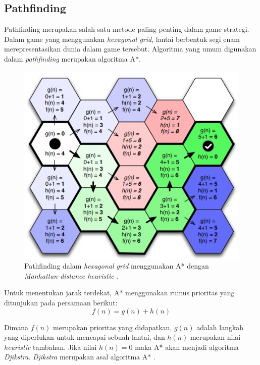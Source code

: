 \subsection{Pathfinding}
Pathfinding merupakan salah satu metode paling penting dalam game strategi.
Dalam game yang menggunakan \emph{hexagonal grid}, lantai berbentuk segi enam merepresentasikan dunia dalam game tersebut.
Algoritma yang umum digunakan dalam \emph{pathfinding} merupakan algoritma A*.

\begin{figure}[H]
  \centering
    \includegraphics[scale=1]{gambar/pathfinding_hexagonal_grids.jpg}
    \caption{Pathfinding dalam \emph{hexagonal grid} menggunakan A* dengan \emph{Manhattan-distance heuristic} \citep{AI4X}.}
    \label{fig:pathfindingHexagonalGrid}
\end{figure}

Untuk menentukan jarak terdekat, A* menggunakan rumus prioritas yang ditunjukan pada persamaan berikut:
\begin{equation}
  f(n) = g(n) + h(n)
\end{equation}

Dimana $f(n)$ merupakan prioritas yang didapatkan, $g(n)$ adalah langkah yang diperlukan untuk mencapai sebuah lantai, dan $h(n)$
merupakan nilai \emph{heuristic} tambahan. Jika nilai $h(n) = 0$ maka A* akan menjadi algoritma \emph{Djikstra}.
\emph{Djikstra} merupakan asal algoritma A* \citep{artificialInteligenceForGames}.

